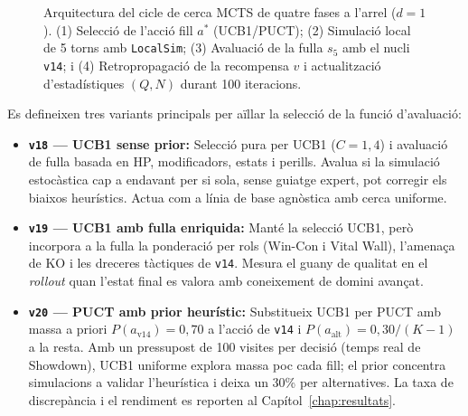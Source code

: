 \begin{figure}[htbp]
{%
    }
    \caption{Arquitectura del cicle de cerca MCTS de quatre fases a l'arrel ($d=1$). (1) Selecció de l'acció fill $a^*$ (UCB1/PUCT); (2) Simulació local de 5 torns amb \texttt{LocalSim}; (3) Avaluació de la fulla $s_5$ amb el nucli \texttt{v14}; i (4) Retropropagació de la recompensa $v$ i actualització d'estadístiques $(Q, N)$ durant 100 iteracions.}
    \label{fig:mcts_diagram}
\end{figure}

Es defineixen tres variants principals per aïllar la selecció de la funció d'avaluació:

\begin{itemize}
    \item \textbf{\texttt{v18} --- UCB1 sense prior:} Selecció pura per UCB1 ($C=1{,}4$) i avaluació de fulla basada en HP, modificadors, estats i perills. Avalua si la simulació estocàstica cap a endavant per si sola, sense guiatge expert, pot corregir els biaixos heurístics. Actua com a línia de base agnòstica amb cerca uniforme.
    \item \textbf{\texttt{v19} --- UCB1 amb fulla enriquida:} Manté la selecció UCB1, però incorpora a la fulla la ponderació per rols (Win-Con i Vital Wall), l'amenaça de KO i les dreceres tàctiques de \texttt{v14}. Mesura el guany de qualitat en el \textit{rollout} quan l'estat final es valora amb coneixement de domini avançat.
    \item \textbf{\texttt{v20} --- PUCT amb prior heurístic:} Substitueix UCB1 per PUCT amb massa a priori $P(a_{\text{v14}}) = 0{,}70$ a l'acció de \texttt{v14} i $P(a_{\text{alt}}) = 0{,}30/(K-1)$ a la resta. Amb un pressupost de 100 visites per decisió (temps real de Showdown), UCB1 uniforme explora massa poc cada fill; el prior concentra simulacions a validar l'heurística i deixa un 30\% per alternatives. La taxa de discrepància i el rendiment es reporten al Capítol~\ref{chap:resultats}.
\end{itemize}

